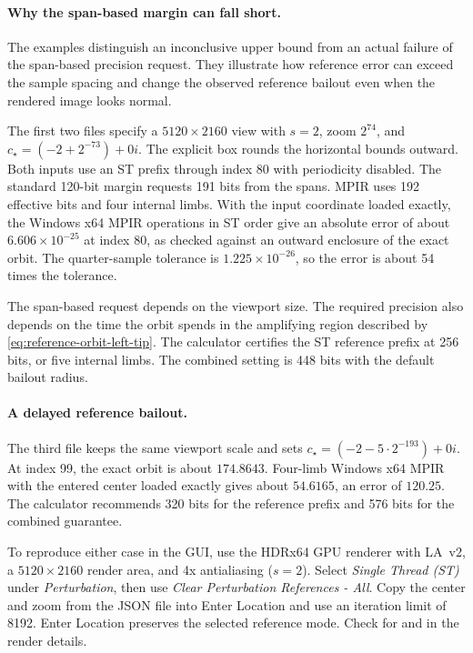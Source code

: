 \paragraph{Why the span-based margin can fall short.}
The examples distinguish an inconclusive upper bound from an actual
failure of the span-based precision request. They illustrate how
reference error can exceed the sample spacing and change the observed
reference bailout even when the rendered image looks normal.

The first two files specify a \(5120\times2160\) view with \(s=2\),
zoom \(2^{74}\), and \(c_\star=(-2+2^{-73})+0i\). The explicit
box rounds the horizontal bounds outward. Both inputs use an ST
prefix through index 80 with periodicity disabled. The standard
120-bit margin requests 191 bits from the spans. MPIR uses 192 effective
bits and four internal limbs. With the input coordinate loaded exactly,
the Windows x64 MPIR operations in ST order give an absolute error of
about \(6.606\times10^{-25}\) at index 80, as checked against an outward
enclosure of the exact orbit. The quarter-sample tolerance is
\(1.225\times10^{-26}\), so the error is about 54 times the tolerance.

The span-based request depends on the viewport size. The required
precision also depends on the time the orbit spends in the
amplifying region described by \eqref{eq:reference-orbit-left-tip}. The
calculator certifies the ST reference prefix at 256 bits, or five
internal limbs. The combined setting is 448 bits with the default
bailout radius.

\paragraph{A delayed reference bailout.}
The third file keeps the same viewport scale and sets
\(c_\star=(-2-5\cdot 2^{-193})+0i\). At index 99, the exact orbit
is about \(174.8643\). Four-limb Windows x64 MPIR with the entered
center loaded exactly gives about \(54.6165\), an error of \(120.25\).
The calculator recommends 320 bits for the reference prefix and
576 bits for the combined guarantee.

To reproduce either case in the GUI, use the HDRx64 GPU renderer
with LA~v2, a \(5120\times2160\) render area, and 4x antialiasing
(\(s=2\)). Select \emph{Single Thread (ST)} under \emph{Perturbation},
then use \emph{Clear Perturbation References - All}. Copy the center
and zoom from the JSON file into Enter Location and use an iteration
limit of 8192. Enter Location preserves the selected reference mode.
Check for  and 
in the render details.

